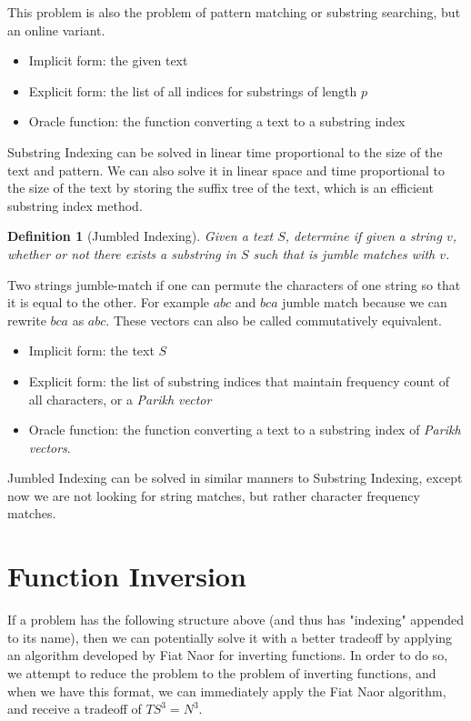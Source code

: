\documentclass{article}
\newtheorem{definition}{Definition}
\begin{document}
This problem is also the problem of pattern matching or substring searching, but an online variant.
\begin{itemize}
    \item Implicit form: the given text
    \item Explicit form: the list of all indices for substrings of length $p$
    \item Oracle function: the function converting a text to a substring index
\end{itemize}
Substring Indexing can be solved in linear time proportional to the size of the text and pattern. We can also solve it in linear space and time proportional to the size of the text by storing the suffix tree of the text, which is an efficient substring index method.
\begin{definition}[Jumbled Indexing]
Given a text $S$, determine if given a string $v$, whether or not there exists a substring in $S$ such that is jumble matches with $v$.
\end{definition}
Two strings jumble-match if one can permute the characters of one string so that it is equal to the other. For example $abc$ and $bca$ jumble match because we can rewrite $bca$ as $abc$. These vectors can also be called commutatively equivalent.
\begin{itemize}
    \item Implicit form: the text $S$
    \item Explicit form: the list of substring indices that maintain frequency count of all characters, or a \textit{Parikh vector}
    \item Oracle function: the function converting a text to a substring index of \textit{Parikh vectors}.
\end{itemize}
Jumbled Indexing can be solved in similar manners to Substring Indexing, except now we are not looking for string matches, but rather character frequency matches.

\section{Function Inversion}
\label{sec:solution}
If a problem has the following structure above (and thus has "indexing" appended to its name), then we can potentially solve it with a better tradeoff by applying an algorithm developed by Fiat Naor for inverting functions. In order to do so, we attempt to reduce the problem to the problem of inverting functions, and when we have this format, we can immediately apply the Fiat Naor algorithm, and receive a tradeoff of $TS^3 = N^3$.
\end{document}

